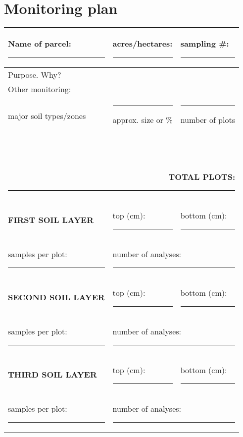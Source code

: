 \documentclass[11pt,letterpaper,oneside,onecolumn]{memoir}
\begin{document}
\section{Monitoring plan}
\label{monitoringplan} 
\small
\begin{tabular}{|lll|}\hline
\rule[-1cm]{0mm}{1cm}Name of parcel:\rule[0mm]{4cm}{0mm}&acres/hectares: \rule[0mm]{2cm}{0mm}&sampling \#:\rule[0mm]{1.2cm}{0mm}\\ \hline
\multicolumn{3}{|l|}{\rule[-10mm]{0mm}{10mm}Purpose. Why?}\\ \hline
\multicolumn{3}{|l|}{\rule[-.7cm]{0mm}{.7cm}Other monitoring:}\\ \hline\hline
major soil types/zones & \vline \rule[0mm]{2mm}{0mm}approx. size or \% & \vline \rule[0mm]{2mm}{0mm}number of plots\\ \hline
&\vline &\vline \\ \hline
&\vline &\vline \\ \hline
&\vline &\vline \\ \hline
&\vline &\vline \\ \hline
&\vline &\vline \\ \hline
&\vline &\vline \\ \hline
&\vline &\vline \\ \hline
&\vline &\vline \\ \hline
&\vline &\vline \\ \hline
\multicolumn{3}{r}{\rule[-4mm]{0mm}{12mm}\textbf{TOTAL PLOTS:}\rule[-1mm]{2cm}{.5pt}}\\ \hline

\textbf{FIRST SOIL LAYER} & top (cm):\rule[-.1cm]{1cm}{.5pt} & bottom (cm):\rule[-.1cm]{1cm}{.5pt}\\
samples per plot:\rule[-.1cm]{1cm}{.5pt} & \multicolumn{2}{l|}{number of analyses:\rule[-.1cm]{1cm}{.5pt}}\\ \hline\hline

\textbf{SECOND SOIL LAYER} & top (cm):\rule[-.1cm]{1cm}{.5pt} & bottom (cm):\rule[-.1cm]{1cm}{.5pt}\\
samples per plot:\rule[-.1cm]{1cm}{.5pt} & \multicolumn{2}{l|}{number of analyses:\rule[-.1cm]{1cm}{.5pt}}\\ \hline\hline

\textbf{THIRD SOIL LAYER} & top (cm):\rule[-.1cm]{1cm}{.5pt} & bottom (cm):\rule[-.1cm]{1cm}{.5pt}\\
samples per plot:\rule[-.1cm]{1cm}{.5pt} & \multicolumn{2}{l|}{number of analyses:\rule[-.1cm]{1cm}{.5pt}}\\ \hline


\end{tabular}
\end{document}
